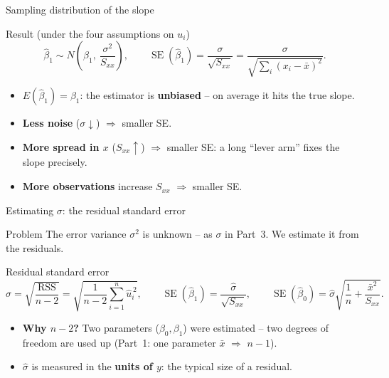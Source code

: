 \documentclass[aspectratio=169,11pt]{beamer}
\begin{document}
\begin{frame}{Sampling distribution of the slope}
  \begin{block}{Result (under the four assumptions on $u_i$)}
    \[
      \hat\beta_1 \sim N\!\left(\beta_1,\ \frac{\sigma^2}{S_{xx}}\right),
      \qquad
      \operatorname{SE}(\hat\beta_1)=\frac{\sigma}{\sqrt{S_{xx}}}
      =\frac{\sigma}{\sqrt{\sum_i (x_i-\bar x)^2}} .
    \]
  \end{block}
  \begin{itemize}\setlength{\itemsep}{3pt}
    \item $E(\hat\beta_1)=\beta_1$: the estimator is \textbf{unbiased} --
          on average it hits the true slope.
    \item \textbf{Less noise} ($\sigma\downarrow$) $\Rightarrow$ smaller SE.
    \item \textbf{More spread in $x$} ($S_{xx}\uparrow$) $\Rightarrow$ smaller
          SE: a long ``lever arm'' fixes the slope precisely.
    \item \textbf{More observations} increase $S_{xx}$ $\Rightarrow$
          smaller SE.
  \end{itemize}
\end{frame}

\begin{frame}{Estimating $\sigma$: the residual standard error}
  \begin{block}{Problem}
    The error variance $\sigma^2$ is unknown -- as $\sigma$ in Part~3. We
    estimate it from the residuals.
  \end{block}
  \begin{block}{Residual standard error}
    \[
      \hat\sigma=\sqrt{\frac{\text{RSS}}{n-2}}
      =\sqrt{\frac{1}{n-2}\sum_{i=1}^n \hat u_i^{\,2}},
      \qquad
      \operatorname{SE}(\hat\beta_1)=\frac{\hat\sigma}{\sqrt{S_{xx}}},
      \qquad
      \operatorname{SE}(\hat\beta_0)=\hat\sigma\sqrt{\frac1n+\frac{\bar x^2}{S_{xx}}} .
    \]
  \end{block}
  \begin{itemize}
    \item \textbf{Why $n-2$?} Two parameters ($\beta_0,\beta_1$) were
          estimated -- two degrees of freedom are used up (Part~1: one
          parameter $\bar x$ $\Rightarrow$ $n-1$).
    \item $\hat\sigma$ is measured in the \textbf{units of $y$}: the typical
          size of a residual.
  \end{itemize}
\end{frame}
\end{document}
